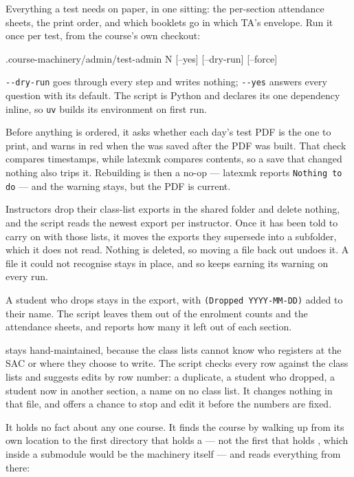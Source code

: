 Everything a test needs on paper, in one sitting: the per-section attendance sheets, the print order, and which booklets go in which TA's envelope.
Run it once per test, from the course's own checkout:

\begin{manexsource}
.course-machinery/admin/test-admin N [--yes] [--dry-run] [--force]
\end{manexsource}

\texttt{-{}-dry-run} goes through every step and writes nothing; \texttt{-{}-yes} answers every question with its default.
The script is Python and declares its one dependency inline, so \texttt{uv} builds its environment on first run.

Before anything is ordered, it asks whether each day's test PDF is the one to print, and warns in red when the  was saved after the PDF was built.
That check compares timestamps, while latexmk compares contents, so a save that changed nothing also trips it.
Rebuilding is then a no-op --- latexmk reports \texttt{Nothing to do} --- and the warning stays, but the PDF is current.

Instructors drop their class-list exports in the shared folder and delete nothing, and the script reads the newest export per instructor.
Once it has been told to carry on with those lists, it moves the exports they supersede into a  subfolder, which it does not read.
Nothing is deleted, so moving a file back out undoes it.
A file it could not recognise stays in place, and so keeps earning its warning on every run.

A student who drops stays in the export, with \texttt{(Dropped YYYY-MM-DD)} added to their name.
The script leaves them out of the enrolment counts and the attendance sheets, and reports how many it left out of each section.

 stays hand-maintained, because the class lists cannot know who registers at the SAC or where they choose to write.
The script checks every row against the class lists and suggests edits by row number: a duplicate, a student who dropped, a student now in another section, a name on no class list.
It changes nothing in that file, and offers a chance to stop and edit it before the numbers are fixed.

It holds no fact about any one course.
It finds the course by walking up from its own location to the first directory that holds a  --- not the first that holds , which inside a submodule would be the machinery itself --- and reads everything from there:

